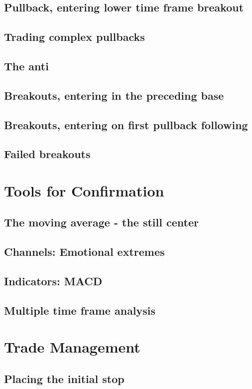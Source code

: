 \documentclass[10pt,twocolumn]{article}
\begin{document}
\subsection{Pullback, entering lower time frame breakout}
\subsection{Trading complex pullbacks}
\subsection{The anti}
\subsection{Breakouts, entering in the preceding base}
\subsection{Breakouts, entering on first pullback following}
\subsection{Failed breakouts}

\section{Tools for Confirmation}
\subsection{The moving average - the still center}
\subsection{Channels: Emotional extremes}
\subsection{Indicators: MACD}
\subsection{Multiple time frame analysis}

\section{Trade Management}
\subsection{Placing the initial stop}
\end{document}
